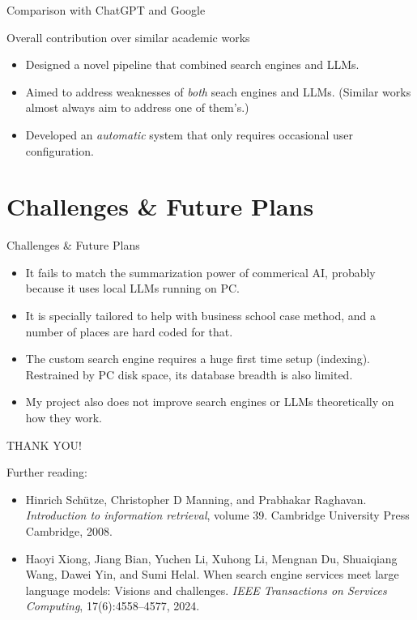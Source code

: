 \documentclass{beamer}
\begin{document}
\begin{frame}{Comparison with ChatGPT and Google}
\begin{center}
\end{center}
\end{frame}

\begin{frame}{Overall contribution over similar academic works}
	\begin{itemize}
		\item Designed a novel pipeline that combined search engines and LLMs.
		\item Aimed to address weaknesses of \emph{both} seach engines and
			LLMs. (Similar works almost always aim to address one of them's.)
		\item Developed an \emph{automatic} system that only requires
			occasional user configuration.
	\end{itemize}
\end{frame}

\section*{Challenges \& Future Plans}
\begin{frame}{Challenges \& Future Plans}

  \begin{itemize}
  \item
	  It fails to match the summarization power of commerical AI, probably
	  because it uses local LLMs running on PC.
  \item
	  It is specially tailored to help with business school case method, and a
	  number of places are hard coded for that.
  \item 
	  The custom search engine requires a huge first time setup (indexing).
	  Restrained by PC disk space, its database breadth is also limited.
  \item 
	  My project also does not improve search engines or LLMs theoretically on
	  how they work.
  \end{itemize}
\end{frame}

\begin{frame}
	\begin{center}
	{\large THANK YOU!}
	\end{center}

	Further reading:
	\begin{itemize}
		\item Hinrich Sch\"utze, Christopher D Manning, and Prabhakar Raghavan.
			\emph{Introduction to information retrieval}, volume 39.
			Cambridge University Press Cambridge, 2008.
		\item Haoyi Xiong, Jiang Bian, Yuchen Li, Xuhong Li, Mengnan Du,
			Shuaiqiang Wang, Dawei Yin, and Sumi Helal. When search engine
			services meet large language models: Visions and challenges.
			\emph{IEEE Transactions on Services Computing}, 17(6):4558--4577,
			2024.
	\end{itemize}
\end{frame}
\end{document}
